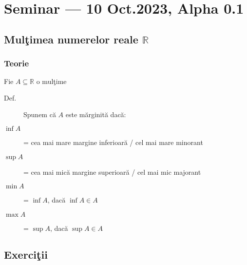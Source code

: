 \documentclass[a4paper, 12pt, notitlepage]{book}
\begin{document}


    \newcommand\revstr{Alpha 0.1}
    \chapter{Seminar --- 10 Oct.\@ 2023, \revstr}

    \section{Mul\c{t}imea numerelor reale $\mathbb{R}$}
    \subsection{Teorie}
    Fie $A \subseteq \mathbb{R}$ o mul\c{t}ime
    \begin{description}
      \item[Def.] Spunem c\u{a} $A$ este m\u{a}rginit\u{a} dac\u{a}:
      \item[$\inf A$] = cea mai mare margine inferioar\u{a} / cel mai mare minorant
      \item[$\sup A$] = cea mai mic\u{a} margine superioar\u{a} / cel mai mic majorant
      \item[$\min A$] = $\inf A$, dac\u{a} $\inf A \in A$
      \item[$\max A$] = $\sup A$, dac\u{a} $\sup A \in A$
    \end{description}

    \section{Exerci\c{t}ii}
\end{document}
